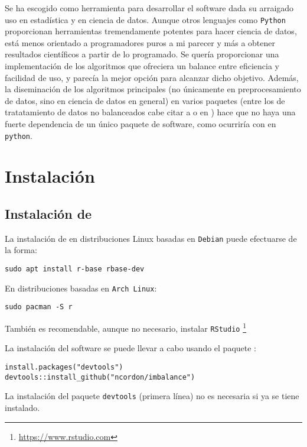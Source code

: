 Se ha escogido \R como herramienta para desarrollar el software dada su arraigado uso en estadística y en ciencia
de datos. Aunque otros lenguajes como \texttt{Python} proporcionan herramientas tremendamente potentes para
hacer ciencia de datos, \R está menos orientado a programadores puros a mi parecer y más a obtener resultados
científicos a partir de lo programado. Se quería proporcionar una implementación de los algoritmos que 
ofreciera un balance entre eficiencia y facilidad de uso, y \R parecía la mejor opción para alcanzar dicho
objetivo. Además, la diseminación de los algoritmos principales (no únicamente en preprocesamiento de datos,
sino en ciencia de datos en general) en varios paquetes (entre los de tratatamiento de datos no balanceados cabe
citar a  o  en \R) hace que no haya una fuerte dependencia de un 
único paquete de software, como ocurriría con  en \texttt{python}.

\section{Instalación}
\subsection{Instalación de \R}
La instalación de \R en distribuciones Linux basadas en \texttt{Debian} puede efectuarse de la forma:
\begin{lstlisting}
sudo apt install r-base rbase-dev
\end{lstlisting}

En distribuciones basadas en \texttt{Arch Linux}:
\begin{lstlisting}
sudo pacman -S r
\end{lstlisting}

También es recomendable, aunque no necesario, instalar \texttt{RStudio} \footnote{\url{https://www.rstudio.com}}


La instalación del software se puede llevar a cabo usando el paquete :
\begin{lstlisting}
install.packages("devtools")
devtools::install_github("ncordon/imbalance")
\end{lstlisting}

La instalación del paquete \texttt{devtools} (primera línea) no es necesaria si ya se tiene instalado.


  